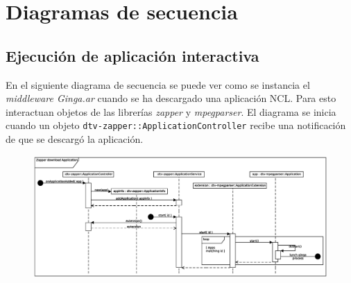 \section{Diagramas de secuencia}

\subsection{Ejecución de aplicación interactiva}
En el siguiente diagrama de secuencia se puede ver como se instancia el \textit{middleware Ginga.ar} cuando se ha descargado una aplicación NCL. 
Para esto interactuan objetos de las librerías \textit{zapper} y \textit{mpegparser}. 
El diagrama se inicia cuando un objeto \texttt{dtv-zapper::ApplicationController} recibe una notificación de que se descargó la aplicación.
\begin{figure}[ht!]
\centering
\includegraphics[scale=0.35,angle=-90]{../resources/uml-sequence-diagram-zapper-start-ginga}
\end{figure}

\pagebreak 
